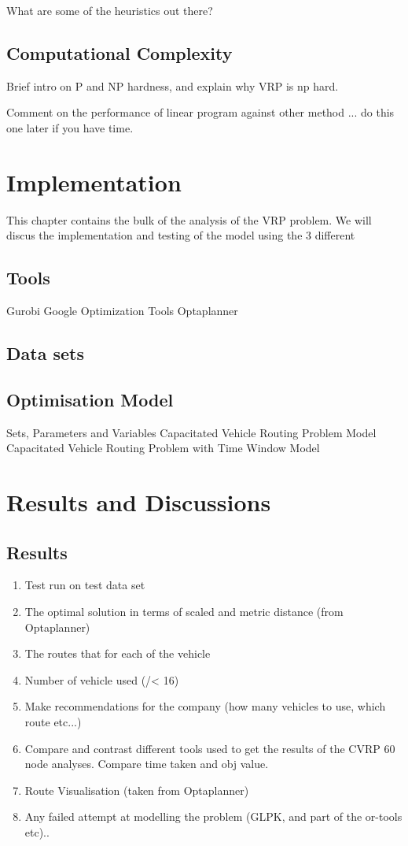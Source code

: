 \documentclass[a4paper, 12pt]{report}
\begin{document}
What are some of the heuristics out there?

\section{Computational Complexity}
Brief intro on P and NP hardness, and explain why VRP is np hard.

Comment on the performance of linear program against other method
... do this one later if you have time.


\chapter{Implementation}

This chapter contains the bulk of the analysis of the VRP problem. We will discus the implementation and testing of the model
using the 3 different

\section{Tools}
Gurobi
Google Optimization Tools
Optaplanner

\section{Data sets}

\section{Optimisation Model}
Sets, Parameters and Variables
Capacitated Vehicle Routing Problem Model
Capacitated Vehicle Routing Problem with Time Window Model

\chapter{Results and Discussions}
\section{Results}
\begin{enumerate}
\item Test run on test data set
\item The optimal solution in terms of scaled and metric distance (from Optaplanner)
\item The routes that for each of the vehicle
\item Number of vehicle used (/< 16)
\item Make recommendations for the company (how many vehicles to use, which route etc...)
\item Compare and contrast different tools used to get the results of the CVRP 60 node analyses. Compare time taken and obj value.
\item Route Visualisation (taken from Optaplanner)
\item Any failed attempt at modelling the problem (GLPK, and part of the or-tools etc)..
\end{enumerate}
\end{document}

